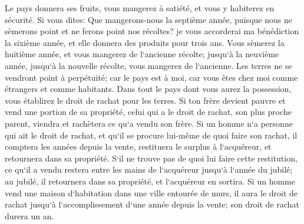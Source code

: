 \verse Le pays donnera ses fruits, vous mangerez à satiété, et vous y habiterez en sécurité. 
\verse Si vous dites: Que mangerons-nous la septième année, puisque nous ne sèmerons point et ne ferons point nos récoltes? 
\verse je vous accorderai ma bénédiction la sixième année, et elle donnera des produits pour trois ans. 
\verse Vous sèmerez la huitième année, et vous mangerez de l`ancienne récolte; jusqu`à la neuvième année, jusqu`à la nouvelle récolte, vous mangerez de l`ancienne. 
\verse Les terres ne se vendront point à perpétuité; car le pays est à moi, car vous êtes chez moi comme étrangers et comme habitants. 
\verse Dans tout le pays dont vous aurez la possession, vous établirez le droit de rachat pour les terres. 
\verse Si ton frère devient pauvre et vend une portion de sa propriété, celui qui a le droit de rachat, son plus proche parent, viendra et rachètera ce qu`a vendu son frère. 
\verse Si un homme n`a personne qui ait le droit de rachat, et qu`il se procure lui-même de quoi faire son rachat, 
\verse il comptera les années depuis la vente, restituera le surplus à l`acquéreur, et retournera dans sa propriété. 
\verse S`il ne trouve pas de quoi lui faire cette restitution, ce qu`il a vendu restera entre les mains de l`acquéreur jusqu`à l`année du jubilé; au jubilé, il retournera dans sa propriété, et l`acquéreur en sortira. 
\verse Si un homme vend une maison d`habitation dans une ville entourée de murs, il aura le droit de rachat jusqu`à l`accomplissement d`une année depuis la vente; son droit de rachat durera un an. 
